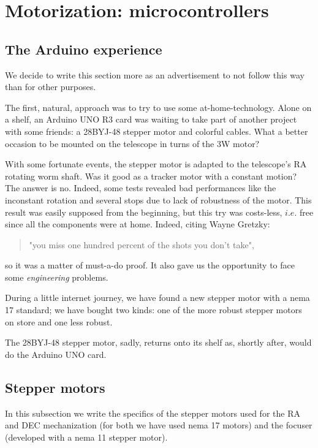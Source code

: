 \section{Motorization: microcontrollers}
\subsection{The Arduino experience}
We decide to write this section more as an advertisement to not follow this way than for other purposes.

The first, natural, approach was to try to use some at-home-technology.
Alone on a shelf, an Arduino UNO R3 card was waiting to take part of another project with some friends: a 28BYJ-48 stepper motor and colorful cables.
What a better occasion to be mounted on the telescope in turns of the 3W motor?

With some fortunate events, the stepper motor is adapted to the telescope's RA rotating worm shaft.
Was it good as a tracker motor with a constant motion?
The answer is no.
Indeed, some tests revealed bad performances like the inconstant rotation and several stops due to lack of robustness of the motor.
This result was easily supposed from the beginning, but this try was costs-less, \(i.e.\) free since all the components were at home.
Indeed, citing Wayne Gretzky:
\begin{quote}
    "you miss one hundred percent of the shots you don't take",
\end{quote}
so it was a matter of must-a-do proof.
It also gave us the opportunity to face some \textit{engineering} problems.

During a little internet journey, we have found a new stepper motor with a nema 17 standard;
we have bought two kinds: one of the more robust stepper motors on store and one less robust.

The 28BYJ-48 stepper motor, sadly, returns onto its shelf as, shortly after, would do the Arduino UNO card.

\subsection{Stepper motors}
In this subsection we write the specifics of the stepper motors used for the RA and DEC mechanization (for both we have used nema 17 motors) and the focuser (developed with a nema 11 stepper motor).

